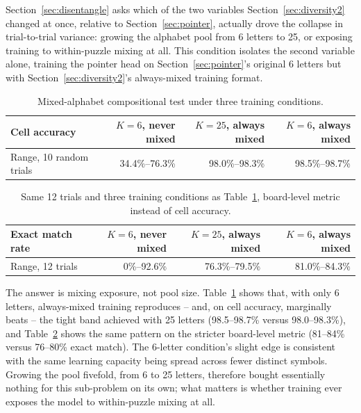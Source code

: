 \documentclass{article} %
\begin{document}
Section~\ref{sec:disentangle} asks which of the two variables
Section~\ref{sec:diversity2} changed at once, relative to
Section~\ref{sec:pointer}, actually drove the collapse in
trial-to-trial variance: growing the alphabet pool from 6 letters to
25, or exposing training to within-puzzle mixing at all. This
condition isolates the second variable alone, training the pointer
head on Section~\ref{sec:pointer}'s original 6 letters but with
Section~\ref{sec:diversity2}'s always-mixed training format.

\begin{table}[h]
\centering
\small
\begin{tabular}{lrrr}
\hline
Cell accuracy & $K{=}6$, never mixed & $K{=}25$, always mixed & $K{=}6$, always mixed \\
\hline
Range, 10 random trials & 34.4\%--76.3\% & 98.0\%--98.3\% & 98.5\%--98.7\% \\
\hline
\end{tabular}
\caption{Mixed-alphabet compositional test under three training
conditions.}
\label{tab:disentangle-mixed}
\end{table}

\begin{table}[h]
\centering
\small
\begin{tabular}{lrrr}
\hline
Exact match rate & $K{=}6$, never mixed & $K{=}25$, always mixed & $K{=}6$, always mixed \\
\hline
Range, 12 trials & 0\%--92.6\% & 76.3\%--79.5\% & 81.0\%--84.3\% \\
\hline
\end{tabular}
\caption{Same 12 trials and three training conditions as
Table~\ref{tab:disentangle-mixed}, board-level metric instead of cell
accuracy.}
\label{tab:disentangle-mixed-exact}
\end{table}

The answer is mixing exposure, not pool size. Table~\ref{tab:disentangle-mixed}
shows that, with only 6 letters, always-mixed training reproduces --
and, on cell accuracy, marginally beats -- the tight band achieved with
25 letters (98.5--98.7\% versus 98.0--98.3\%), and
Table~\ref{tab:disentangle-mixed-exact} shows the same pattern on the
stricter board-level metric (81--84\% versus 76--80\% exact match). The
6-letter condition's slight edge is consistent with the same learning
capacity being spread across fewer distinct symbols. Growing the pool
fivefold, from 6 to 25 letters, therefore bought essentially nothing
for this sub-problem on its own; what matters is whether training ever
exposes the model to within-puzzle mixing at all.
\end{document}
